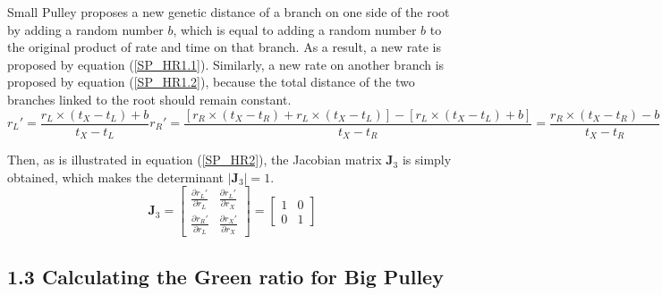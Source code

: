 \documentclass{bmcart}
\begin{document}
\begin{backmatter}
Small Pulley proposes a new genetic distance of a branch on one side of the root by adding a random number $b$, which is equal to adding a random number $b$ to the original product of rate and time on that branch. As a result, a new rate is proposed by equation (\ref{SP_HR1.1}). Similarly, a new rate on another branch is proposed by equation (\ref{SP_HR1.2}), because the total distance of the two branches linked to the root should remain constant.
\begin{subequations}\label{SP_HR1}
\begin{equation}\label{SP_HR1.1}
{r_L}' = \frac{{{r_L} \times ({t_X} - {t_L}) + b}}{{{t_X} - {t_L}}}
\end{equation}
\begin{equation}\label{SP_HR1.2}
{r_R}' = \frac{{[{r_R} \times ({t_X} - {t_R}) + {r_L} \times ({t_X} - {t_L})] - [{r_L} \times ({t_X} - {t_L}) + b]}}{{{t_X} - {t_R}}} = \frac{{{r_R} \times ({t_X} - {t_R}) - b}}{{{t_X} - {t_R}}}
\end{equation}
\end{subequations}

Then, as is illustrated in equation (\ref{SP_HR2}), the Jacobian matrix ${{\mathbf{J}}_3}$ is simply obtained, which makes the determinant $\left| {{{\mathbf{J}}_3}} \right| = 1$.
\begin{equation}\label{SP_HR2}
{{\mathbf{J}}_3} = \left[ {\begin{array}{*{20}{c}}
  {\frac{{\partial {r_L}'}}{{\partial {r_L}}}}&{\frac{{\partial {r_L}'}}{{\partial {r_X}}}} \\
  {\frac{{\partial {r_R}'}}{{\partial {r_L}}}}&{\frac{{\partial {r_X}'}}{{\partial {r_X}}}}
\end{array}} \right] = \left[ {\begin{array}{*{20}{c}}
  1&0 \\
  0&1
\end{array}} \right]
\end{equation}
\subsection*{1.3 Calculating the Green ratio for Big Pulley}


\end{backmatter}
\end{document}
